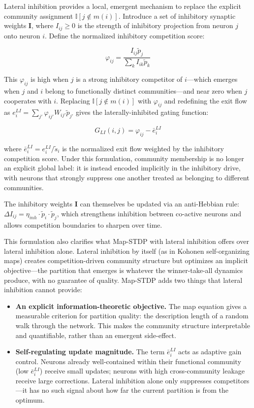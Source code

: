 \documentclass[pdflatex,sn-mathphys-num]{sn-jnl}%
\theoremstyle{thmstyleone}%
\theoremstyle{thmstyletwo}%
\theoremstyle{thmstylethree}%
\begin{document}
Lateral inhibition provides a local, emergent mechanism to replace the explicit community assignment $\mathbb{I}[j \notin m(i)]$. Introduce a set of inhibitory synaptic weights $\mathbf{I}$, where $I_{ij} \geq 0$ is the strength of inhibitory projection from neuron $j$ onto neuron $i$. Define the normalized inhibitory competition score:

$$\varphi_{ij} = \frac{I_{ij} \tilde{p}_j}{\sum_k I_{ik} \tilde{p}_k}$$

This $\varphi_{ij}$ is high when $j$ is a strong inhibitory competitor of $i$---which emerges when $j$ and $i$ belong to functionally distinct communities---and near zero when $j$ cooperates with $i$. Replacing $\mathbb{I}[j \notin m(i)]$ with $\varphi_{ij}$ and redefining the exit flow as $e_i^{LI} = \sum_{j'} \varphi_{ij'} W_{ij'} \tilde{p}_{j'}$ gives the laterally-inhibited gating function:

\begin{equation}
G_{LI}(i,j) = \varphi_{ij} - \bar{e}_i^{LI}
\end{equation}

where $\bar{e}_i^{LI} = e_i^{LI} / \tilde{s}_i$ is the normalized exit flow weighted by the inhibitory competition score. Under this formulation, community membership is no longer an explicit global label: it is instead encoded implicitly in the inhibitory drive, with neurons that strongly suppress one another treated as belonging to different communities.

The inhibitory weights $\mathbf{I}$ can themselves be updated via an anti-Hebbian rule: $\Delta I_{ij} = \eta_{inh} \cdot \tilde{p}_i \cdot \tilde{p}_j$, which strengthens inhibition between co-active neurons and allows competition boundaries to sharpen over time.

This formulation also clarifies what Map-STDP with lateral inhibition offers over lateral inhibition alone. Lateral inhibition by itself (as in Kohonen self-organizing maps) creates competition-driven community structure but optimizes an implicit objective---the partition that emerges is whatever the winner-take-all dynamics produce, with no guarantee of quality. Map-STDP adds two things that lateral inhibition cannot provide:

\begin{itemize}
    \item \textbf{An explicit information-theoretic objective.} The map equation gives a measurable criterion for partition quality: the description length of a random walk through the network. This makes the community structure interpretable and quantifiable, rather than an emergent side-effect.
    \item \textbf{Self-regulating update magnitude.} The term $\bar{e}_i^{LI}$ acts as adaptive gain control. Neurons already well-contained within their functional community (low $\bar{e}_i^{LI}$) receive small updates; neurons with high cross-community leakage receive large corrections. Lateral inhibition alone only suppresses competitors---it has no such signal about how far the current partition is from the optimum.
\end{itemize}
\end{document}

